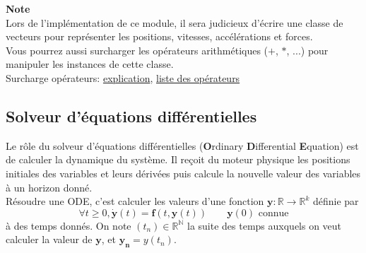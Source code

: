 \documentclass{article}
\newcommand{\myvec}[1]{\ensuremath{\mathbf{#1}}}
\begin{document}
\vspace{1em}

\noindent\textbf{Note} \\
Lors de l'implémentation de ce module, il sera judicieux d'écrire une classe de vecteurs pour représenter les positions, vitesses, accélérations et forces. \\
Vous pourrez aussi surcharger les opérateurs arithmétiques ($+$, $*$, ...) pour manipuler les instances de cette classe.\\
Surcharge opérateurs: \href{https://openclassrooms.com/fr/courses/235344-apprenez-a-programmer-en-python/233046-appliquez-des-methodes-speciales#/id/r-232928}{explication}, \href{https://docs.python.org/fr/3/library/operator.html}{liste des opérateurs}

\subsection{Solveur d'équations différentielles}
\label{solveur}

Le rôle du solveur d'équations différentielles (\textbf{O}rdinary \textbf{D}ifferential \textbf{E}quation) est de calculer la dynamique du système. Il reçoit du moteur physique les positions initiales des variables et leurs dérivées puis calcule la nouvelle valeur des variables à un horizon donné.\\
Résoudre une ODE, c'est calculer les valeurs d'une fonction $\myvec{y} : \mathbb{R} \rightarrow \mathbb{R}^k$ définie par
\begin{equation*}
\forall t \ge 0, \myvec{\dot{y}}(t) = \myvec{f}(t, \myvec{y}(t)) \quad\quad \myvec{y}(0) \text{ connue}
\end{equation*}
à des temps donnés. On note $(t_n) \in \mathbb{R}^\mathbb{N}$ la suite des temps auxquels on veut calculer la valeur de $\myvec{y}$, et $\myvec{y_n} = y(t_n)$.

\vspace{1em}
\end{document}
